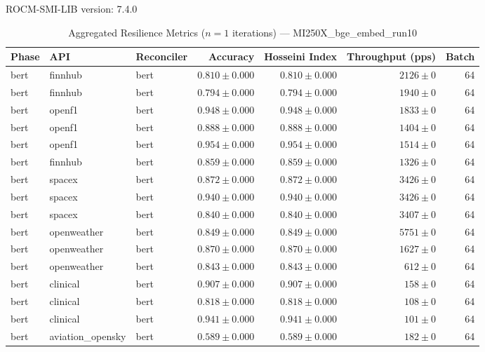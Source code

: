 ROCM-SMI-LIB version: 7.4.0

\begin{table}[htbp]
\caption{Aggregated Resilience Metrics ($n=1$ iterations) --- MI250X_bge_embed_run10}
\begin{tabular}{l l l r r r r}
\hline
Phase & API & Reconciler & Accuracy & Hosseini Index & Throughput (pps) & Batch \\
\hline
bert & finnhub & bert & $0.810\pm0.000$ & $0.810\pm0.000$ & $2126\pm0$ & 64 \\
bert & finnhub & bert & $0.794\pm0.000$ & $0.794\pm0.000$ & $1940\pm0$ & 64 \\
bert & openf1 & bert & $0.948\pm0.000$ & $0.948\pm0.000$ & $1833\pm0$ & 64 \\
bert & openf1 & bert & $0.888\pm0.000$ & $0.888\pm0.000$ & $1404\pm0$ & 64 \\
bert & openf1 & bert & $0.954\pm0.000$ & $0.954\pm0.000$ & $1514\pm0$ & 64 \\
bert & finnhub & bert & $0.859\pm0.000$ & $0.859\pm0.000$ & $1326\pm0$ & 64 \\
bert & spacex & bert & $0.872\pm0.000$ & $0.872\pm0.000$ & $3426\pm0$ & 64 \\
bert & spacex & bert & $0.940\pm0.000$ & $0.940\pm0.000$ & $3426\pm0$ & 64 \\
bert & spacex & bert & $0.840\pm0.000$ & $0.840\pm0.000$ & $3407\pm0$ & 64 \\
bert & openweather & bert & $0.849\pm0.000$ & $0.849\pm0.000$ & $5751\pm0$ & 64 \\
bert & openweather & bert & $0.870\pm0.000$ & $0.870\pm0.000$ & $1627\pm0$ & 64 \\
bert & openweather & bert & $0.843\pm0.000$ & $0.843\pm0.000$ & $612\pm0$ & 64 \\
bert & clinical & bert & $0.907\pm0.000$ & $0.907\pm0.000$ & $158\pm0$ & 64 \\
bert & clinical & bert & $0.818\pm0.000$ & $0.818\pm0.000$ & $108\pm0$ & 64 \\
bert & clinical & bert & $0.941\pm0.000$ & $0.941\pm0.000$ & $101\pm0$ & 64 \\
bert & aviation\_opensky & bert & $0.589\pm0.000$ & $0.589\pm0.000$ & $182\pm0$ & 64 \\

\end{tabular}
\end{table}
